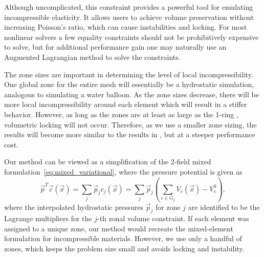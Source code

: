 Although uncomplicated, this constraint provides a powerful tool for emulating incompressible
elasticity. It allows users to achieve volume preservation without increasing Poisson's ratio,
which can cause instabilities and locking. For most nonlinear solvers a few equality constraints should not be prohibitively expensive to solve, but for additional performance gain one may naturally use an Augmented Lagrangian method to solve the constraints. 

The zone sizes are important in determining the level of local incompressibility. One global zone
for the entire mesh will essentially be a hydrostatic simulation, analogous to simulating a water
balloon. As the zone sizes decrease, there will be more local incompressibility around each element
which will result in a stiffer behavior. However, as long as the zones are at least as large as the
1-ring \cite{Irving:2007}, volumetric locking will not occur. Therefore, as we use a smaller zone
sizing, the results will become more similar to the results in \cite{Irving:2007}, but at a steeper performance cost. 

Our method can be viewed as a simplification of the 2-field mixed
formulation~\eqref{eq:mixed_variational}, where the pressure potential is given as
\begin{equation}
\vec{p}^{T}\vec{c}(\vec{x}) = \sum_j \vec{p}_j c_j(\vec{x}) = \sum_j \vec{p}_j \left( \sum_{e \in G_j}
V_e(\vec{x}) - V_e^0 \right),
\label{eq:variational_lagrange}
\end{equation}
where the interpolated hydrostatic pressures $\vec{p}_j$ for zone $j$ are identified to be the
Lagrange multipliers for the $j$-th zonal volume constraint. If each element was assigned to a unique
zone, our method would recreate the mixed-element formulation for incompressible materials. However,
we use only a handful of zones, which keeps the problem size small and avoids locking and instability.


